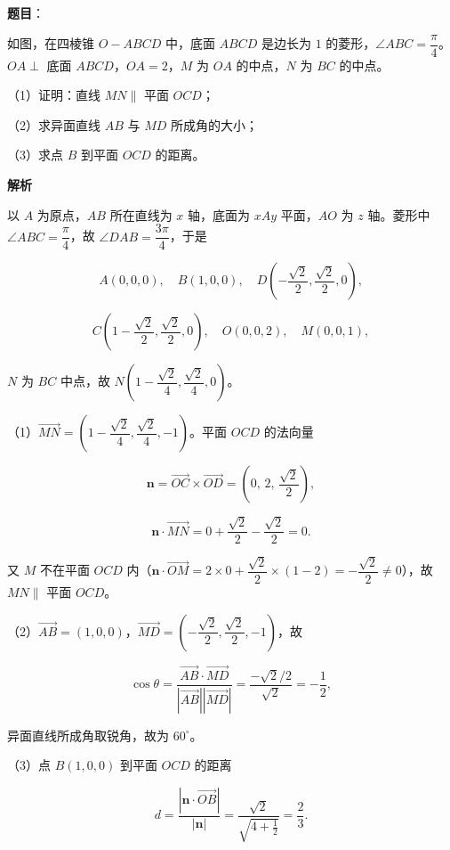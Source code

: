 \begin{answer}

\textbf{题目}：

如图，在四棱锥 $O-ABCD$ 中，底面 $ABCD$ 是边长为 $1$ 的菱形，$\angle ABC=\dfrac{\pi}{4}$。$OA\perp$ 底面 $ABCD$，$OA=2$，$M$ 为 $OA$ 的中点，$N$ 为 $BC$ 的中点。

（1）证明：直线 $MN\parallel$ 平面 $OCD$；

（2）求异面直线 $AB$ 与 $MD$ 所成角的大小；

（3）求点 $B$ 到平面 $OCD$ 的距离。
\nopagebreak[4]
\begin{center}\end{center}
\nopagebreak[4]
\textbf{解析}

以 $A$ 为原点，$AB$ 所在直线为 $x$ 轴，底面为 $xAy$ 平面，$AO$ 为 $z$ 轴。菱形中 $\angle ABC=\dfrac{\pi}4$，故 $\angle DAB=\dfrac{3\pi}4$，于是

\nopagebreak[4]
\[A(0,0,0),\quad B(1,0,0),\quad D\left(-\frac{\sqrt2}2,\frac{\sqrt2}2,0\right),\]

\nopagebreak[4]
\[C\left(1-\frac{\sqrt2}2,\frac{\sqrt2}2,0\right),\quad O(0,0,2),\quad M(0,0,1),\]

$N$ 为 $BC$ 中点，故 $N\left(1-\dfrac{\sqrt2}4,\dfrac{\sqrt2}4,0\right)$。

（1）$\overrightarrow{MN}=\left(1-\dfrac{\sqrt2}4,\dfrac{\sqrt2}4,-1\right)$。平面 $OCD$ 的法向量

\nopagebreak[4]
\[\boldsymbol n=\overrightarrow{OC}\times\overrightarrow{OD}=\left(0,\,2,\,\frac{\sqrt2}2\right),\]

\nopagebreak[4]
\[\boldsymbol n\cdot\overrightarrow{MN}=0+\frac{\sqrt2}2-\frac{\sqrt2}2=0.\]

又 $M$ 不在平面 $OCD$ 内（$\boldsymbol n\cdot\overrightarrow{OM}=2\times0+\dfrac{\sqrt2}2\times(1-2)=-\dfrac{\sqrt2}2\neq0$），故 $MN\parallel$ 平面 $OCD$。

（2）$\overrightarrow{AB}=(1,0,0)$，$\overrightarrow{MD}=\left(-\dfrac{\sqrt2}2,\dfrac{\sqrt2}2,-1\right)$，故

\nopagebreak[4]
\[\cos\theta=\frac{\overrightarrow{AB}\cdot\overrightarrow{MD}}{\left|\overrightarrow{AB}\right|\left|\overrightarrow{MD}\right|}=\frac{-\sqrt2/2}{\sqrt2}=-\frac12,\]

异面直线所成角取锐角，故为 $60^\circ$。

（3）点 $B(1,0,0)$ 到平面 $OCD$ 的距离

\nopagebreak[4]
\[d=\frac{\left|\boldsymbol n\cdot\overrightarrow{OB}\right|}{\left|\boldsymbol n\right|}=\frac{\sqrt2}{\sqrt{4+\frac12}}=\frac23.\]


\end{answer}
